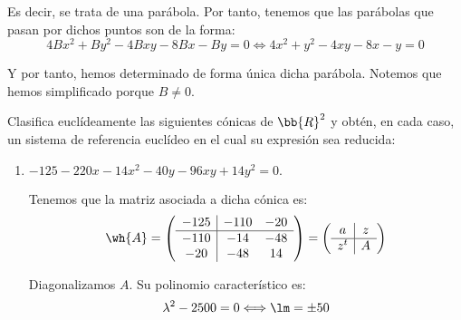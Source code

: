 \begin{ejercicio}
    Es decir, se trata de una parábola. Por tanto, tenemos que las parábolas que pasan por dichos puntos son de la forma:
    \begin{equation*}
        4Bx^2 + By^2-4Bxy -8Bx-By=0 \Longleftrightarrow 4x^2 + y^2-4xy -8x-y=0
    \end{equation*}

    Y por tanto, hemos determinado de forma única dicha parábola. Notemos que hemos simplificado porque $B\neq 0$.
\end{ejercicio}


\begin{ejercicio}
    Clasifica euclídeamente las siguientes cónicas de $\bb{R}^2$ y obtén, en cada caso, un sistema de referencia euclídeo en el cual su expresión sea reducida:
    \begin{enumerate}
        \item $-125 - 220x - 14x^2 - 40y - 96xy + 14y^2 = 0.$
        
        Tenemos que la matriz asociada a dicha cónica es:
        \begin{equation*}
            \wh{A} = \left(\begin{array}{c|cc}
                -125 & -110 & -20  \\ \hline
                -110 & -14 & -48 \\
                -20 &  -48 & 14
            \end{array}\right)
            = \left(\begin{array}{c|c}
                a & z \\ \hline
                z^t & A
            \end{array}\right)
        \end{equation*}
        
        Diagonalizamos $A$. Su polinomio característico es:
        \begin{equation*}
            \lambda^2 -2500 = 0 \Longleftrightarrow \lm = \pm 50
        \end{equation*}


\end{enumerate}
\end{ejercicio}
